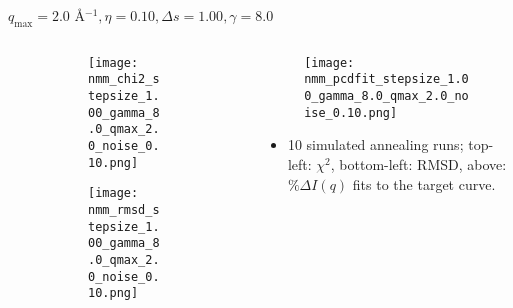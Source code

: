 \documentclass{beamer}
\begin{document}
\begin{frame}{$ q_{\textrm{max}}=2.0 $ \AA $^{-1}, \eta=0.10, \Delta s=1.00, \gamma=8.0$}
	\begin{columns}
		\begin{column}{.5\textwidth}
			\begin{figure}[H]
			\centering
			\begin{subfigure}[b]{\textwidth}
				\centering
				\texttt{[image: nmm\_chi2\_stepsize\_1.00\_gamma\_8.0\_qmax\_2.0\_noise\_0.10.png]}
				\label{fig:}
			\end{subfigure}
			\begin{subfigure}[b]{\textwidth}
				\centering
				\texttt{[image: nmm\_rmsd\_stepsize\_1.00\_gamma\_8.0\_qmax\_2.0\_noise\_0.10.png]}
				\label{fig:}
			\end{subfigure}
			\end{figure}
		\end{column}
		\begin{column}{.5\textwidth}
			\begin{figure}[H]
				\centering
				\texttt{[image: nmm\_pcdfit\_stepsize\_1.00\_gamma\_8.0\_qmax\_2.0\_noise\_0.10.png]}
				\label{fig:}
			\end{figure}
			\begin{itemize}
				\item 10 simulated annealing runs; top-left: $\chi^2$, bottom-left: RMSD, above: $\%\Delta I(q)$ fits to the target curve.
			\end{itemize}
		\end{column}
	\end{columns}
\end{frame}
 
\end{document}
